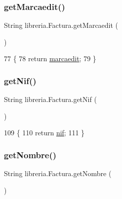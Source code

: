 \subsubsection{\texorpdfstring{get\+Marcaedit()}{getMarcaedit()}}
{\footnotesize\ttfamily String libreria.\+Factura.\+get\+Marcaedit (\begin{DoxyParamCaption}{ }\end{DoxyParamCaption})\hspace{0.3cm}{\ttfamily [inline]}}


\begin{DoxyCode}
77                                  \{
78         \textcolor{keywordflow}{return} \mbox{\hyperlink{classlibreria_1_1_factura_a71087e2afc07fab380ed309a19577cec}{marcaedit}};
79     \}
\end{DoxyCode}
\mbox{\label{classlibreria_1_1_factura_aa27c8a4c3978ca28dcccd7581b4eb493}} 
\subsubsection{\texorpdfstring{get\+Nif()}{getNif()}}
{\footnotesize\ttfamily String libreria.\+Factura.\+get\+Nif (\begin{DoxyParamCaption}{ }\end{DoxyParamCaption})\hspace{0.3cm}{\ttfamily [inline]}}


\begin{DoxyCode}
109                            \{
110         \textcolor{keywordflow}{return} \mbox{\hyperlink{classlibreria_1_1_factura_a13e68de98d752d7226ca9107446075ec}{nif}};
111     \}
\end{DoxyCode}
\mbox{\label{classlibreria_1_1_factura_aeae223296a430d8ad41d930d52036386}} 
\subsubsection{\texorpdfstring{get\+Nombre()}{getNombre()}}
{\footnotesize\ttfamily String libreria.\+Factura.\+get\+Nombre (\begin{DoxyParamCaption}{ }\end{DoxyParamCaption})\hspace{0.3cm}{\ttfamily [inline]}}


